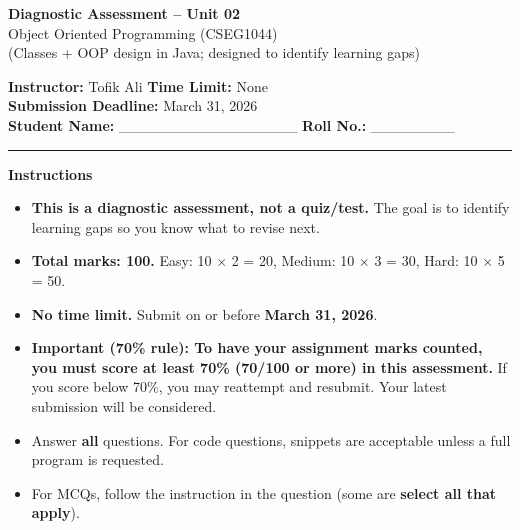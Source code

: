 \documentclass[11pt,a4paper]{article}
\begin{document}
\begin{center}
  {\LARGE \textbf{Diagnostic Assessment -- Unit 02}}\\[0.25em]
  {\large Object Oriented Programming (CSEG1044)}\\[0.25em]
  \normalsize (Classes + OOP design in Java; designed to identify learning gaps)
\end{center}

\noindent
\textbf{Instructor:} Tofik Ali \hfill \textbf{Time Limit:} None\\
\textbf{Submission Deadline:} March 31, 2026\\
\textbf{Student Name:} \_\_\_\_\_\_\_\_\_\_\_\_\_\_\_\_\_ \hfill \textbf{Roll No.:} \_\_\_\_\_\_\_\_\\

\vspace{0.6em}
\hrule
\vspace{0.8em}

\textbf{Instructions}
\begin{itemize}[leftmargin=*]
  \item \textbf{This is a diagnostic assessment, not a quiz/test.} The goal is to identify learning gaps so you know what to revise next.
  \item \textbf{Total marks: 100.} Easy: 10 $\times$ 2 = 20, Medium: 10 $\times$ 3 = 30, Hard: 10 $\times$ 5 = 50.
  \item \textbf{No time limit.} Submit on or before \textbf{March 31, 2026}.
  \item \textbf{Important (70\% rule): To have your assignment marks counted, you must score at least 70\% (70/100 or more) in this assessment.}
    If you score below 70\%, you may reattempt and resubmit. Your latest submission will be considered.
  \item Answer \textbf{all} questions. For code questions, snippets are acceptable unless a full program is requested.
  \item For MCQs, follow the instruction in the question (some are \textbf{select all that apply}).
\end{itemize}

\vspace{0.6em}
\end{document}
